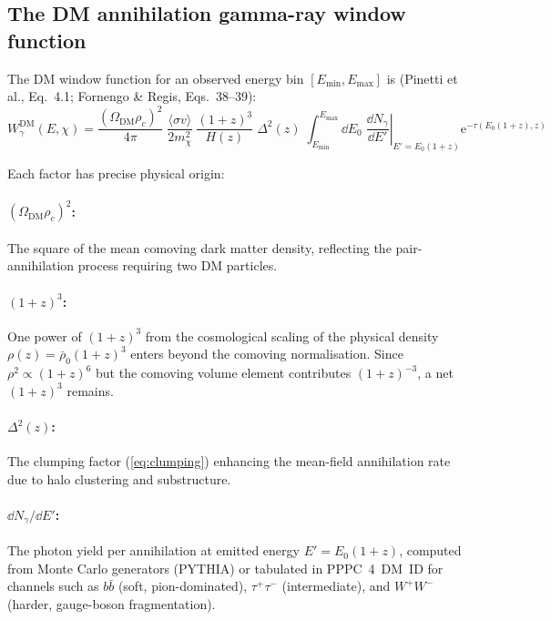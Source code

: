 \documentclass[10pt,a4paper]{article}
\newcommand{\rhobar}{\bar{\rho}}
\newcommand{\sigv}{\langle\sigma v\rangle}
\newcommand{\mchi}{m_\chi}
\newcommand{\ee}{\mathrm{e}}
\begin{document}
\subsection{The DM annihilation gamma-ray window function}

The DM window function for an observed energy bin $[E_{\mathrm{min}}, E_{\mathrm{max}}]$ is (Pinetti et al., Eq.~4.1; Fornengo \& Regis, Eqs.~38--39):
\begin{equation}
\label{eq:W_DM}
\boxed{
W_\gamma^{\mathrm{DM}}(E, \chi) = \frac{(\Omega_{\mathrm{DM}} \rho_c)^2}{4\pi} \; \frac{\sigv}{2\mchi^2} \; \frac{(1 + z)^3}{H(z)} \; \Delta^2(z) \; \int_{E_{\mathrm{min}}}^{E_{\mathrm{max}}} \dd E_0 \; \left.\frac{\dd N_\gamma}{\dd E'}\right|_{E' = E_0(1+z)} \ee^{-\tau(E_0(1+z), z)}
}
\end{equation}

Each factor has precise physical origin:

\paragraph{$(\Omega_{\mathrm{DM}} \rho_c)^2$:} The square of the mean comoving dark matter density, reflecting the pair-annihilation process requiring two DM particles.

\paragraph{$(1 + z)^3$:} One power of $(1 + z)^3$ from the cosmological scaling of the physical density $\rho(z) = \rhobar_0 (1 + z)^3$ enters beyond the comoving normalisation. Since $\rho^2 \propto (1 + z)^6$ but the comoving volume element contributes $(1 + z)^{-3}$, a net $(1 + z)^3$ remains.

\paragraph{$\Delta^2(z)$:} The clumping factor (\cref{eq:clumping}) enhancing the mean-field annihilation rate due to halo clustering and substructure.

\paragraph{$\dd N_\gamma / \dd E'$:} The photon yield per annihilation at emitted energy $E' = E_0(1 + z)$, computed from Monte Carlo generators (PYTHIA) or tabulated in PPPC~4~DM~ID for channels such as $b\bar{b}$ (soft, pion-dominated), $\tau^+\tau^-$ (intermediate), and $W^+W^-$ (harder, gauge-boson fragmentation).
\end{document}
